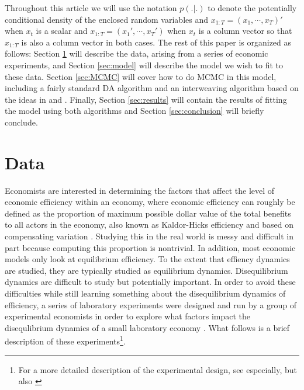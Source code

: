 \documentclass[graybox]{svmult}
\begin{document}
Throughout this article we will use the notation $p(.|.)$ to denote the potentially conditional density of the enclosed random variables and $x_{1:T}=(x_1,\cdots,x_T)'$ when $x_t$ is a scalar and $x_{1:T}=(x_1',\cdots,x_T')$ when $x_t$ is a column vector so that $x_{1:T}$ is also a column vector in both cases. The rest of this paper is organized as follows: Section \ref{sec:data} will describe the data, arising from a series of economic experiments, and Section \ref{sec:model} will describe the model we wish to fit to these data. Section \ref{sec:MCMC} will cover how to do MCMC in this model, including a fairly standard DA algorithm and an interweaving algorithm based on the ideas in \citet{simpson2014interweaving} and \citet{yu2011center}. Finally, Section \ref{sec:results} will contain the results of fitting the model using both algorithms and Section \ref{sec:conclusion} will briefly conclude.

\section{Data}\label{sec:data}
Economists are interested in determining the factors that affect the level of economic efficiency within an economy, where economic efficiency can roughly be defined as the proportion of maximum possible dollar value of the total benefits to all actors in the economy, also known as Kaldor-Hicks efficiency and based on compensating variation \citep{kaldor1939welfare,mas1995microeconomic}. Studying this in the real world is messy and difficult in part because computing this proportion is nontrivial. In addition, most economic models only look at equilibrium efficiency. To the extent that effiency dynamics are studied, they are typically studied as equilibrium dynamics. Disequilibrium dynamics are difficult to study but potentially important. In order to avoid these difficulties while still learning something about the disequilibrium dynamics of efficiency, a series of laboratory experiments were designed and run by a group of experimental economists in order to explore what factors impact the disequlibrium dynamics of a small laboratory economy \citep{crockett2009exchange,kimbrough2010exchange}. What follows is a brief description of these experiments\footnote{For a more detailed description of the experimental design, see \citet{crockett2009exchange} especially, but also \citet{kimbrough2010exchange}}.
\end{document}
